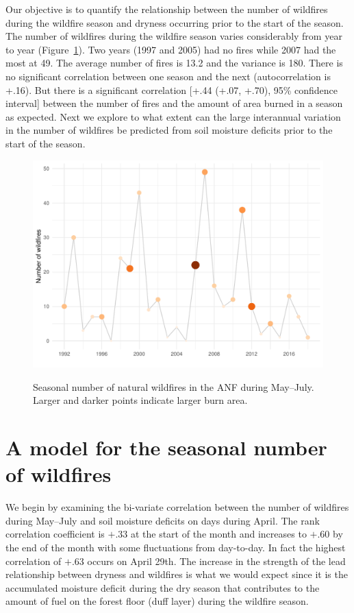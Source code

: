 \documentclass[12pt]{iopart}
\begin{document}
Our objective is to quantify the relationship between the number of wildfires during the wildfire season and dryness occurring prior to the start of the season. The number of wildfires during the wildfire season varies considerably from year to year (Figure~\ref{NumberOfWildfires}). Two years (1997 and 2005) had no fires while 2007 had the most at 49. The average number of fires is 13.2 and the variance is 180. There is no significant correlation between one season and the next (autocorrelation is +.16). But there is a significant correlation [+.44 (+.07, +.70), 95\% confidence interval] between the number of fires and the amount of area burned in a season as expected. Next we explore to what extent can the large interannual variation in the number of wildfires be predicted from soil moisture deficits prior to the start of the season.
\begin{figure}[t]
\noindent\includegraphics[scale=.8,trim=0in 0in 0in 0in,clip]{NumberOfWildfires.pdf}\\
\vspace{-.5in}
\caption{Seasonal number of natural wildfires in the ANF during May--July. Larger and darker points indicate larger burn area.}
\label{NumberOfWildfires}
\end{figure}

\section{A model for the seasonal number of wildfires}

We begin by examining the bi-variate correlation between the number of wildfires during May--July and soil moisture deficits on days during April. The rank correlation coefficient is $+$.33 at the start of the month and increases to $+$.60 by the end of the month with some fluctuations from day-to-day. In fact the highest correlation of $+$.63 occurs on April 29th. The increase in the strength of the lead relationship between dryness and wildfires is what we would expect since it is the accumulated moisture deficit during the dry season that contributes to the amount of fuel on the forest floor (duff layer) during the wildfire season.
\end{document}
